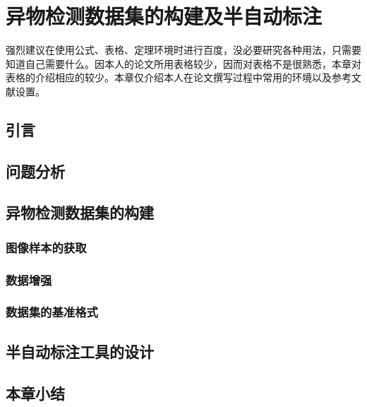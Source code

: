 
\chapter{异物检测数据集的构建及半自动标注}
强烈建议在使用公式、表格、定理环境时进行百度，没必要研究各种用法，只需要知道自己需要什么。因本人的论文所用表格较少，因而对表格不是很熟悉，本章对表格的介绍相应的较少。本章仅介绍本人在论文撰写过程中常用的环境以及参考文献设置。

\section{引言}
\section{问题分析}
\section{异物检测数据集的构建}
\subsection{图像样本的获取}
\subsection{数据增强}
\subsection{数据集的基准格式}
\section{半自动标注工具的设计}
\section{本章小结}
